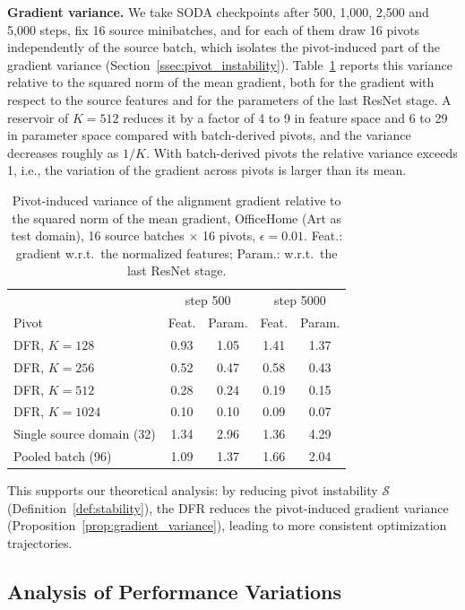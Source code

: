 \textbf{Gradient variance.} We take SODA checkpoints after 500, 1,000, 2,500 and 5,000 steps, fix 16 source minibatches, and for each of them draw 16 pivots independently of the source batch, which isolates the pivot-induced part of the gradient variance (Section~\ref{ssec:pivot_instability}). Table~\ref{tab:gradvar} reports this variance relative to the squared norm of the mean gradient, both for the gradient with respect to the source features and for the parameters of the last ResNet stage. A reservoir of $K=512$ reduces it by a factor of 4 to 9 in feature space and 6 to 29 in parameter space compared with batch-derived pivots, and the variance decreases roughly as $1/K$. With batch-derived pivots the relative variance exceeds 1, i.e., the variation of the gradient across pivots is larger than its mean.

\begin{table}[t]
\caption{Pivot-induced variance of the alignment gradient relative to the squared norm of the mean gradient, OfficeHome (Art as test domain), 16 source batches $\times$ 16 pivots, $\epsilon=0.01$. Feat.: gradient w.r.t.\ the normalized features; Param.: w.r.t.\ the last ResNet stage.}
\label{tab:gradvar}
\centering
\small
\begin{tabular}{lcccc}
\toprule
 & \multicolumn{2}{c}{step 500} & \multicolumn{2}{c}{step 5000} \\
Pivot & Feat. & Param. & Feat. & Param. \\
\midrule
DFR, $K=128$ & 0.93 & 1.05 & 1.41 & 1.37 \\
DFR, $K=256$ & 0.52 & 0.47 & 0.58 & 0.43 \\
DFR, $K=512$ & 0.28 & 0.24 & 0.19 & 0.15 \\
DFR, $K=1024$ & 0.10 & 0.10 & 0.09 & 0.07 \\
Single source domain (32) & 1.34 & 2.96 & 1.36 & 4.29 \\
Pooled batch (96) & 1.09 & 1.37 & 1.66 & 2.04 \\
\bottomrule
\end{tabular}
\end{table}

This supports our theoretical analysis: by reducing pivot instability $\mathcal{S}$ (Definition~\ref{def:stability}), the DFR reduces the pivot-induced gradient variance (Proposition~\ref{prop:gradient_variance}), leading to more consistent optimization trajectories.

\subsection{Analysis of Performance Variations}
\label{ssec:failure_analysis}


